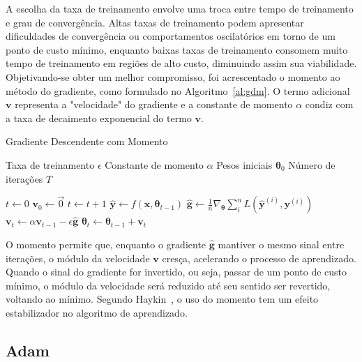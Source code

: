 A escolha da taxa de treinamento envolve uma troca entre tempo de treinamento e grau de convergência. Altas taxas de treinamento podem apresentar dificuldades de convergência ou comportamentos oscilatórios em torno de um ponto de custo mínimo, enquanto baixas taxas de treinamento consomem muito tempo de treinamento em regiões de alto custo, diminuindo assim sua viabilidade. Objetivando-se obter um melhor compromisso, foi acrescentado o momento ao método do gradiente, como formulado no Algoritmo~\ref{al:gdm}. O termo adicional $\mathbf{v}$ representa a "velocidade" do gradiente e a constante de momento $\alpha$ condiz com a taxa de decaimento exponencial do termo $\mathbf{v}$.

\begin{algorithm}
    \caption{Gradiente Descendente com Momento}
    \label{al:gdm}
    \begin{algorithmic}[1]
        \Require Taxa de treinamento $\epsilon$
        \Require Constante de momento $\alpha$
        \Require Pesos iniciais $\boldsymbol{\theta}_{0}$
        \Require Número de iterações $T$

        \State $t \gets 0$
        \State $\mathbf{v}_{0} \gets \vec{0}$
            \State $t \gets t + 1$
            \State $\mathbf{\hat{y}} \gets f(\mathbf{x}, \boldsymbol{\theta}_{t-1})$
            \State $\mathbf{\hat{g}} \gets \frac{1}{n} \nabla_{\boldsymbol{\theta}} \sum_i^n L(\mathbf{\hat{y}}^{(i)}, \mathbf{y}^{(i)})$
            \State $\mathbf{v}_{t} \gets \alpha \mathbf{v}_{t-1} - \epsilon \mathbf{\hat{g}}$
            \State $\boldsymbol{\theta}_{t} \gets \boldsymbol{\theta}_{t-1} + \mathbf{v}_t$
        \EndWhile
    \end{algorithmic}
\end{algorithm}

O momento permite que, enquanto o gradiente $\mathbf{\hat{g}}$ mantiver o mesmo sinal entre iterações, o módulo da velocidade $\mathbf{v}$ cresça, acelerando o processo de aprendizado. Quando o sinal do gradiente for invertido, ou seja, passar de um ponto de custo mínimo, o módulo da velocidade será reduzido até seu sentido ser revertido, voltando ao mínimo. Segundo Haykin~\cite{haykin09}, o uso do momento tem um efeito estabilizador no algoritmo de aprendizado.

\subsection{Adam}


